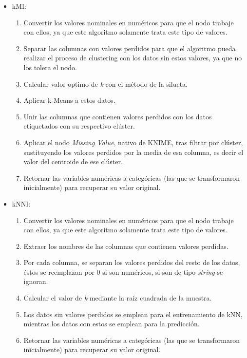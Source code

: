 \begin{itemize}
	\item kMI:
	\begin{enumerate}
		\item Convertir los valores nominales en numéricos para que el nodo trabaje con ellos, ya que este algoritmo solamente trata este tipo de valores.
		\item Separar las columnas con valores perdidos para que el algoritmo pueda realizar el proceso de clustering con los datos sin estos valores, ya que no los tolera el nodo.
		\item Calcular valor optimo de \textit{k} con el método de la silueta.
		\item Aplicar k-Means a estos datos.
		\item Unir las columnas que contienen valores perdidos con los datos etiquetados con su respectivo clúster.
		\item Aplicar el nodo \textit{Missing Value}, nativo de KNIME, tras filtrar por clúster, sustituyendo los valores perdidos por la media de esa columna, es decir el valor del centroide de ese clúster.
		\item Retornar las variables numéricas a categóricas (las que se transformaron inicialmente) para recuperar su valor original.
	\end{enumerate}
	\item kNNI:
	\begin{enumerate}
		\item Convertir los valores nominales en numéricos para que el nodo trabaje con ellos, ya que este algoritmo solamente trata este tipo de valores.
		\item Extraer los nombres de las columnas que contienen valores perdidas.
		\item Por cada columna, se separan los valores perdidos del resto de los datos, éstos se reemplazan por 0 si son numéricos, si son de tipo \textit{string} se ignoran.
		\item Calcular el valor de \textit{k} mediante la raíz cuadrada de la muestra. 
		\item Los datos sin valores perdidos se emplean para el entrenamiento de kNN, mientras los datos con estos se emplean para la predicción.
		\item Retornar las variables numéricas a categóricas (las que se transformaron inicialmente) para recuperar su valor original.
	\end{enumerate}
\end{itemize}

